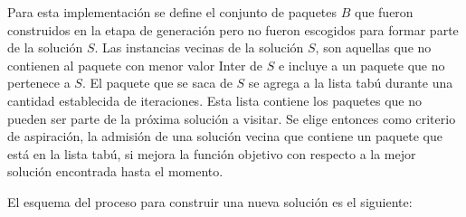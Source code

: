 Para esta implementación se define el conjunto de paquetes $B$ que fueron construidos en la etapa de generación pero no fueron escogidos para formar parte de la solución $S$. Las instancias vecinas de la solución $S$, son aquellas que no contienen al paquete con menor valor Inter de $S$ e incluye a un paquete que no pertenece a $S$. El paquete que se saca de $S$ se agrega a la lista tabú durante una cantidad establecida de iteraciones. Esta lista contiene los paquetes que no pueden ser parte de la próxima solución a visitar. Se elige entonces como criterio de aspiración, la admisión de una solución vecina que contiene un paquete que está en la lista tabú, si mejora la función objetivo con respecto a la mejor solución encontrada hasta el momento.

El esquema del proceso para construir una nueva solución es el siguiente:

